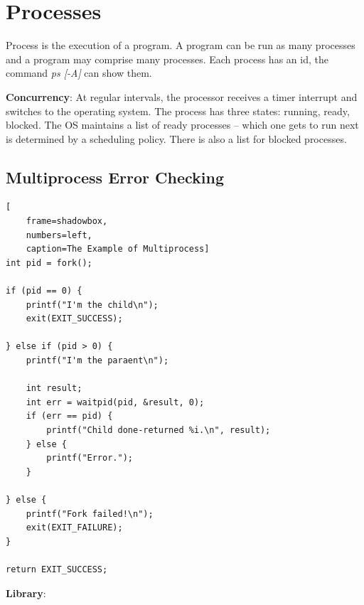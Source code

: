 \documentclass{article}
\begin{document}
\section{Processes}

Process is the execution of a program. A program can be run as many processes and a program may comprise many processes. Each process has an id, the command \textit{ps [-A]} can show them.

\textbf{Concurrency}: At regular intervals, the processor receives a timer interrupt and switches to the operating system. The process has three states: running, ready, blocked. The OS maintains a list of ready processes – which one gets to run next is determined by a scheduling policy. There is also a list for blocked processes.

\subsection{Multiprocess Error Checking}

\begin{lstlisting}[
    frame=shadowbox,
    numbers=left,
    caption=The Example of Multiprocess]
int pid = fork();

if (pid == 0) {
    printf("I'm the child\n");
    exit(EXIT_SUCCESS);
    
} else if (pid > 0) {
    printf("I'm the paraent\n");

    int result;
    int err = waitpid(pid, &result, 0);
    if (err == pid) {
        printf("Child done-returned %i.\n", result);
    } else {
        printf("Error.");
    }
    
} else {
    printf("Fork failed!\n");
    exit(EXIT_FAILURE);
}

return EXIT_SUCCESS;
\end{lstlisting}

\textbf{Library}:
\end{document}
